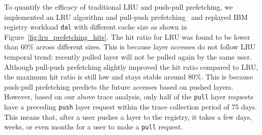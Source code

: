 To quantify the efficacy of traditional LRU and push-pull prefetching,
we implemented an LRU algorithm and pull-push prefetching~\cite{dockerworkload} 
and replayed 
IBM registry workload \texttt{dal} with different cache size as shown in 
Figure~\ref{fig:lru_prefetching_hits}.
The hit ratio for LRU was found to be lower than $60$\% across different sizes.
This is because layer accesses do not follow LRU temporal trend:
recently pulled layer will not be pulled again by the same user.
Although pull-push prefetching slightly improved the hit ratio compared to LRU,
the maximum hit ratio is still low and stays stable around $80$\%.
This is because push-pull prefetching predicts the future accesses based on  
pushed layers.
However, based on our above trace analysis,
only half of the \texttt{pull} layer
requests have a preceding \texttt{push} layer request within the trace
collection period of 75 days. This means that, after a user pushes a layer
to the registry, it takes a few days, weeks, or even months for a user to make
a \texttt{pull} request. 




